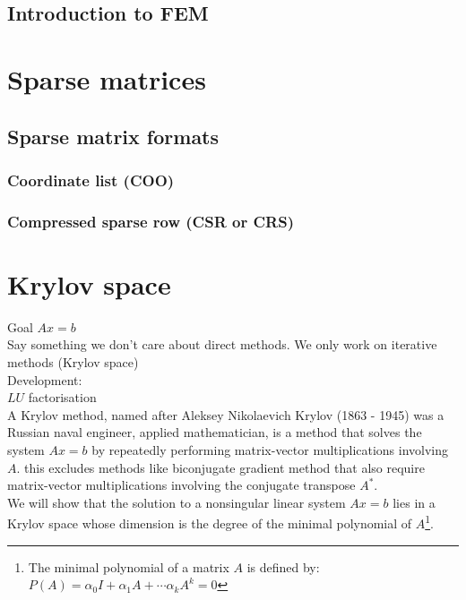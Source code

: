 \subsection{Introduction to FEM}

\newpage


\section{Sparse matrices}

\subsection{Sparse matrix formats}
\subsubsection{Coordinate list (COO)}
\subsubsection{Compressed sparse row (CSR or CRS)}

\newpage


\section{Krylov space}

Goal $Ax = b$\\
Say something we don't care about direct methods. We only work on iterative methods (Krylov space)\\

Development: \\
$LU$ factorisation\\


A Krylov method, named after Aleksey Nikolaevich Krylov (1863 - 1945) was a Russian naval engineer, applied mathematician, is a method that solves the system $Ax = b$ by repeatedly performing matrix-vector multiplications involving $A$. this excludes methods like biconjugate gradient method that also require matrix-vector multiplications involving the conjugate transpose $A^{*}$.\\
We will show that the solution to a nonsingular linear system $Ax = b$ lies in a Krylov space whose dimension is the degree of the minimal polynomial of $A$\footnote{The minimal polynomial of a matrix $A$ is defined by: $P(A) = \alpha_{0}I + \alpha_{1}A + \cdots \alpha_{k}A^{k} = 0$ }. 

